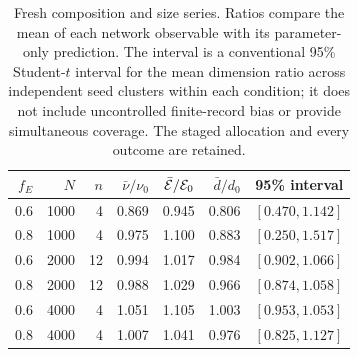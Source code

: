 \begin{table}[t]
\centering
\caption{Fresh composition and size series. Ratios compare the mean of each
network observable with its parameter-only prediction. The interval is a
conventional 95\% Student-$t$ interval for the mean dimension ratio across
independent seed clusters within each condition; it does not include
uncontrolled finite-record bias or provide simultaneous coverage. The
staged allocation and every outcome are retained.}
\label{tab:composition}
\begin{tabular}{rrrrrrr}
\toprule
$f_E$&$N$&$n$&$\bar\nu/\nu_0$&$\bar{\mathcal E}/\mathcal E_0$&$\bar d/d_0$&95\% interval\\
\midrule
0.6&1000&4&0.869&0.945&0.806&$[0.470,1.142]$\\
0.8&1000&4&0.975&1.100&0.883&$[0.250,1.517]$\\
0.6&2000&12&0.994&1.017&0.984&$[0.902,1.066]$\\
0.8&2000&12&0.988&1.029&0.966&$[0.874,1.058]$\\
0.6&4000&4&1.051&1.105&1.003&$[0.953,1.053]$\\
0.8&4000&4&1.007&1.041&0.976&$[0.825,1.127]$\\
\bottomrule
\end{tabular}
\end{table}
